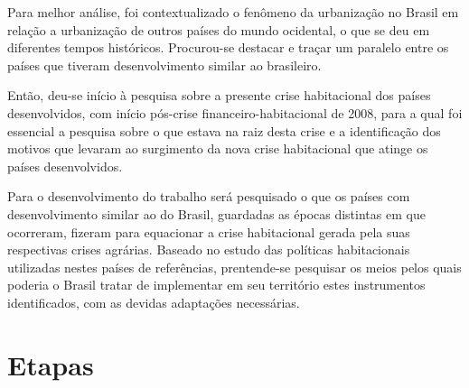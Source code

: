 \documentclass[
	12pt,				%
	oneside,			%
	a4paper,			%
	chapter=TITLE,		%
	section=TITLE,		%
	english,			%
	brazil				%
	]{abntex2}
\begin{document}
Para melhor análise, foi contextualizado o fenômeno da urbanização no Brasil em
relação a urbanização de outros países do mundo ocidental, o que se deu em
diferentes tempos históricos. Procurou-se destacar e traçar um paralelo entre os
países que tiveram desenvolvimento similar ao brasileiro.

Então, deu-se início à pesquisa sobre a presente crise habitacional dos países
desenvolvidos, com início pós-crise financeiro-habitacional de 2008, para a
qual foi essencial a pesquisa sobre o que estava na raiz desta crise e a
identificação dos motivos que levaram ao surgimento da nova crise habitacional
que atinge os países desenvolvidos.

Para o desenvolvimento do trabalho será pesquisado o que os países com
desenvolvimento similar ao do Brasil, guardadas as épocas distintas em que
ocorreram, fizeram para equacionar a crise habitacional gerada pela suas
respectivas crises agrárias. Baseado no estudo das políticas habitacionais
utilizadas nestes países de referências, prentende-se pesquisar os meios pelos
quais poderia o Brasil tratar de implementar em seu território estes
instrumentos identificados, com as devidas adaptações necessárias.

\hypertarget{etapas}{%
\section{Etapas}\label{etapas}}
\end{document}
